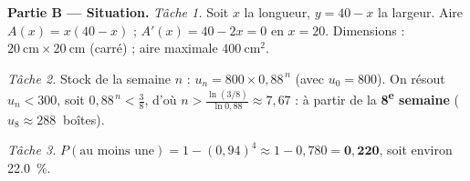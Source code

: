 \smallskip
\noindent\textbf{Partie B — Situation.}
\emph{Tâche 1.} Soit $x$ la longueur, $y=40-x$ la largeur. Aire $A(x)=x(40-x)$ ;
$A'(x)=40-2x=0$ en $x=20$. Dimensions : $\SI{20}{\centi\metre}\times\SI{20}{\centi\metre}$
(carré) ; aire maximale $\SI{400}{\centi\metre\squared}$.

\emph{Tâche 2.} Stock de la semaine $n$ : $u_n=800\times0{,}88^{\,n}$ (avec $u_0=800$). On
résout $u_n<300$, soit $0{,}88^{\,n}<\frac{3}{8}$, d'où $n>\frac{\ln(3/8)}{\ln0{,}88}\approx7{,}67$ :
à partir de la \textbf{8\textsuperscript{e} semaine} ($u_8\approx\SI{288}{}$ boîtes).

\emph{Tâche 3.} $P(\text{au moins une})=1-(0{,}94)^4\approx1-0{,}780=\mathbf{0{,}220}$, soit
environ \SI{22,0}{\percent}.
